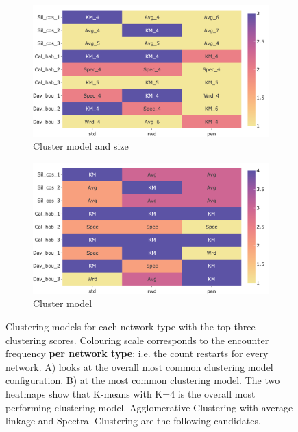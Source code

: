 \begin{figure}[!htb]
    \centering
    \begin{subfigure}[!t]{0.8\textwidth}
        \includegraphics[width=\textwidth,keepaspectratio]{Sections/Network_I/Resources/P0/clustering/top3_cs_gen_p0_tum4K_50TF_v3.png}    
        \caption{Cluster model and size}
        \label{fig:N_I:p0_metr_model_size}
    \end{subfigure}
    \begin{subfigure}[!t]{0.8\textwidth}
        \includegraphics[width=\textwidth,keepaspectratio]{Sections/Network_I/Resources/P0/clustering/top3_cs_model_p0_tum4K_50TF_v3.png}
        \caption{Cluster model}
        \label{fig:N_I:p0_metr_model}
    \end{subfigure} 
    \caption{Clustering models for each network type with the top three clustering scores. Colouring scale corresponds to the encounter frequency \textbf{per network type}; i.e. the count restarts for every network. A) looks at the overall most common clustering model configuration. B) at the most common clustering model. The two heatmaps show that K-means with K=4 is the overall most performing clustering model. Agglomerative Clustering with average linkage and Spectral Clustering are the following candidates.}
    \label{fig:N_I:p0_top_3_metrics_I}
\end{figure}

